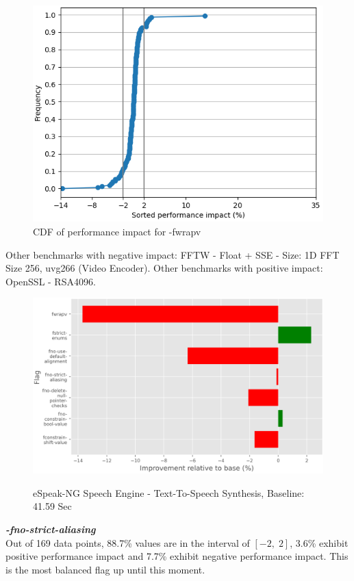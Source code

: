 \documentclass{sciposter}
\begin{document}
\begin{multicols}{3}
\begin{figure}[h!]
\centering
\includegraphics[scale=1.2]{fwrapv}
\caption{CDF of performance impact for -fwrapv}
\end{figure}

Other benchmarks with negative impact: FFTW - Float + SSE - Size: 1D FFT Size
256, uvg266 (Video Encoder). Other benchmarks with positive impact: OpenSSL -
RSA4096.

\begin{figure}[h!]
\centering
\includegraphics[scale=1.2]{espeak} \\
\caption{eSpeak-NG Speech Engine - Text-To-Speech Synthesis, Baseline:
41.59 Sec} 
\label{fig:espeak}
\end{figure}

\textbf{\textit{-fno-strict-aliasing}} \\
Out of 169 data points, 88.7\% values are in the interval of \( [-2,\;2] \), 
3.6\% exhibit positive performance impact and 7.7\% exhibit negative
performance impact. This is the most balanced flag up until this moment.


\end{multicols}
\end{document}

